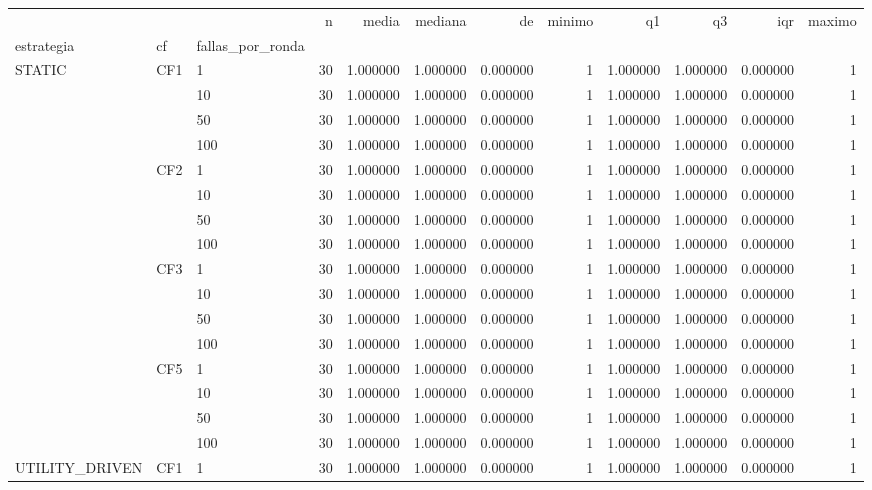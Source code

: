 \begin{tabular}{lllrrrrrrrrr}
\toprule
 &  &  & n & media & mediana & de & minimo & q1 & q3 & iqr & maximo \\
estrategia & cf & fallas_por_ronda &  &  &  &  &  &  &  &  &  \\
\midrule
\multirow[t]{16}{*}{STATIC} & \multirow[t]{4}{*}{CF1} & 1 & 30 & 1.000000 & 1.000000 & 0.000000 & 1 & 1.000000 & 1.000000 & 0.000000 & 1 \\
 &  & 10 & 30 & 1.000000 & 1.000000 & 0.000000 & 1 & 1.000000 & 1.000000 & 0.000000 & 1 \\
 &  & 50 & 30 & 1.000000 & 1.000000 & 0.000000 & 1 & 1.000000 & 1.000000 & 0.000000 & 1 \\
 &  & 100 & 30 & 1.000000 & 1.000000 & 0.000000 & 1 & 1.000000 & 1.000000 & 0.000000 & 1 \\
\cline{2-12}
 & \multirow[t]{4}{*}{CF2} & 1 & 30 & 1.000000 & 1.000000 & 0.000000 & 1 & 1.000000 & 1.000000 & 0.000000 & 1 \\
 &  & 10 & 30 & 1.000000 & 1.000000 & 0.000000 & 1 & 1.000000 & 1.000000 & 0.000000 & 1 \\
 &  & 50 & 30 & 1.000000 & 1.000000 & 0.000000 & 1 & 1.000000 & 1.000000 & 0.000000 & 1 \\
 &  & 100 & 30 & 1.000000 & 1.000000 & 0.000000 & 1 & 1.000000 & 1.000000 & 0.000000 & 1 \\
\cline{2-12}
 & \multirow[t]{4}{*}{CF3} & 1 & 30 & 1.000000 & 1.000000 & 0.000000 & 1 & 1.000000 & 1.000000 & 0.000000 & 1 \\
 &  & 10 & 30 & 1.000000 & 1.000000 & 0.000000 & 1 & 1.000000 & 1.000000 & 0.000000 & 1 \\
 &  & 50 & 30 & 1.000000 & 1.000000 & 0.000000 & 1 & 1.000000 & 1.000000 & 0.000000 & 1 \\
 &  & 100 & 30 & 1.000000 & 1.000000 & 0.000000 & 1 & 1.000000 & 1.000000 & 0.000000 & 1 \\
\cline{2-12}
 & \multirow[t]{4}{*}{CF5} & 1 & 30 & 1.000000 & 1.000000 & 0.000000 & 1 & 1.000000 & 1.000000 & 0.000000 & 1 \\
 &  & 10 & 30 & 1.000000 & 1.000000 & 0.000000 & 1 & 1.000000 & 1.000000 & 0.000000 & 1 \\
 &  & 50 & 30 & 1.000000 & 1.000000 & 0.000000 & 1 & 1.000000 & 1.000000 & 0.000000 & 1 \\
 &  & 100 & 30 & 1.000000 & 1.000000 & 0.000000 & 1 & 1.000000 & 1.000000 & 0.000000 & 1 \\
\cline{1-12} \cline{2-12}
\multirow[t]{16}{*}{UTILITY_DRIVEN} & \multirow[t]{4}{*}{CF1} & 1 & 30 & 1.000000 & 1.000000 & 0.000000 & 1 & 1.000000 & 1.000000 & 0.000000 & 1 \\

\end{tabular}

